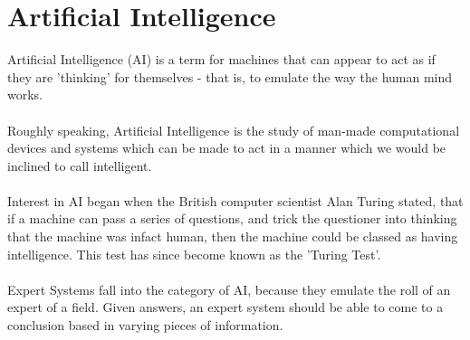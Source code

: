 \documentclass[12pt]{report}
\begin{document}
\section{Artificial Intelligence}\label{sec:AI}
Artificial Intelligence (AI) is a term for machines that can appear to act as if they are 'thinking' for themselves - that is, to emulate the way the human mind works.\\
\\
Roughly speaking, Artificial Intelligence is the study of man-made computational devices and systems which can be made to act in a manner which we would be inclined to call intelligent. \citep{whatisai}
\\
\\
Interest in AI began when the British computer scientist Alan Turing stated, that if a machine can pass a series of questions, and trick the questioner into thinking that the machine was infact human, then the machine could be classed as having intelligence.  This test has since become known as the 'Turing Test'.\\
\\
Expert Systems fall into the category of AI, because they emulate the roll of an expert of a field.  Given answers, an expert system should be able to come to a conclusion based in varying pieces of information.
\end{document}
